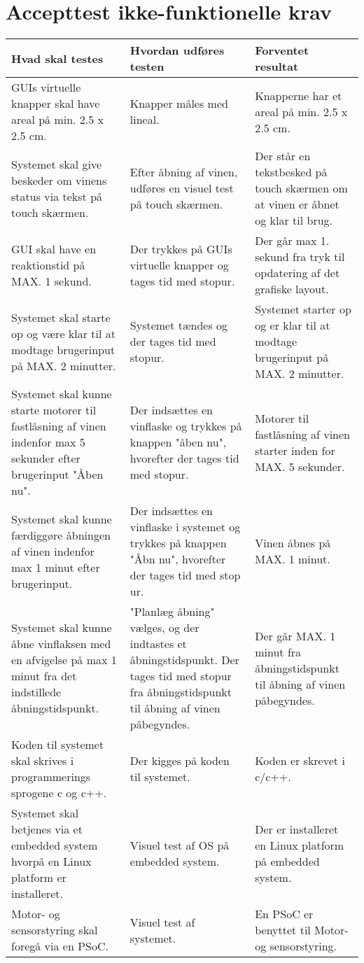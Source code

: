 \section{Accepttest ikke-funktionelle krav}
\begin{center}
    \begin{tabular}{ | p{5cm} | p{5cm} | p{5cm} |}
    \hline
    \bfseries {Hvad skal testes} & \bfseries{Hvordan udføres testen}& \bfseries{Forventet resultat} \\ \hline
    GUIs virtuelle knapper skal have areal på min. 2.5 x 2.5 cm. & Knapper måles med lineal. & Knapperne har et areal på min. 2.5 x 2.5 cm.  \\ \hline
    Systemet skal give beskeder om vinens status via tekst på touch skærmen. & Efter åbning af vinen, udføres en visuel test på touch skærmen. & Der står en tekstbesked på touch skærmen om at vinen er åbnet og klar til brug.  \\ \hline
    GUI skal have en reaktionstid på MAX. 1 sekund. & Der trykkes på GUIs virtuelle knapper og tages tid med stopur. & Der går max 1. sekund fra tryk til opdatering af det grafiske layout. \\ \hline
Systemet skal starte op og være klar til at modtage brugerinput på MAX. 2 minutter.& Systemet tændes og der tages tid med stopur.& Systemet starter op og er klar til at modtage brugerinput på MAX. 2 minutter. \\ \hline
Systemet skal kunne starte motorer til fastlåsning af vinen indenfor max 5 sekunder efter brugerinput "Åben nu".& Der indsættes en vinflaske og trykkes på knappen "åben nu", hvorefter der tages tid med stopur.& Motorer til fastlåsning af vinen starter inden for MAX. 5 sekunder. \\ \hline
Systemet skal kunne færdiggøre åbningen af vinen indenfor max 1 minut efter brugerinput.& Der indsættes en vinflaske i systemet og trykkes på knappen "Åbn nu", hvorefter der tages tid med stop ur.& Vinen åbnes på MAX. 1 minut. \\ \hline
Systemet skal kunne åbne vinflaksen med en afvigelse på max 1 minut fra det indstillede åbningstidspunkt.& "Planlæg åbning" vælges, og der indtastes et åbningstidspunkt. Der tages tid med stopur fra åbningstidspunkt til åbning af vinen påbegyndes.& Der går MAX. 1 minut fra åbningstidspunkt til åbning af vinen påbegyndes. \\ \hline  
Koden til systemet skal skrives i programmerings sprogene c og c++.& Der kigges på koden til systemet.& Koden er skrevet i c/c++.\\ \hline
Systemet skal betjenes via et embedded system hvorpå en Linux platform er installeret.& Visuel test af OS på embedded system.& Der er installeret en Linux platform på embedded system.\\ \hline
Motor- og sensorstyring skal foregå via en PSoC.& Visuel test af systemet.& En PSoC er benyttet til Motor- og sensorstyring.\\  \hline 

    \end{tabular}
\end{center}
